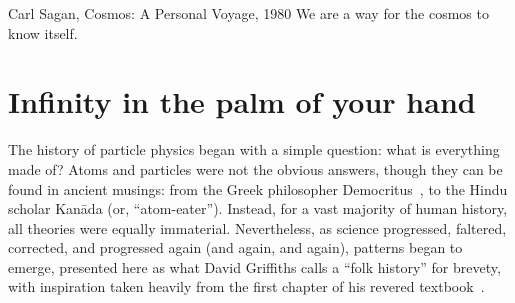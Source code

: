 \begin{dissertationintroduction}
\begin{aquote}{Carl Sagan, Cosmos: A Personal Voyage, 1980}
    We are a way for the cosmos to know itself.
\end{aquote}

\section*{Infinity in the palm of your hand}
The history of particle physics began with a simple question: what is everything made of? 
Atoms and particles were not the obvious answers, though they can be found in ancient musings: from the Greek philosopher Democritus~\cite{Taylor1419554}, to the Hindu scholar Kan\=ada (or, ``atom-eater''). %
Instead, for a vast majority of human history, all theories were equally immaterial. 
Nevertheless, as science progressed, faltered, corrected, and progressed again (and again, and again), patterns began to emerge, presented here as what David Griffiths calls a ``folk history'' for brevety, with inspiration taken heavily from the first chapter of his revered textbook~\cite{Griffiths}.  


\end{dissertationintroduction}
